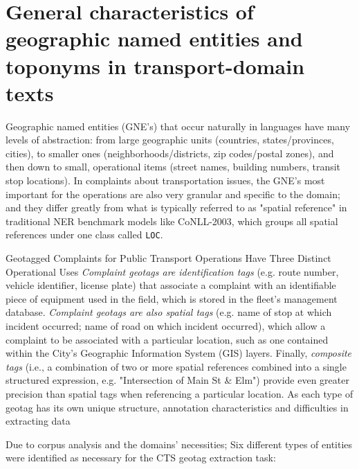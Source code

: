 \section{General characteristics of geographic named entities and toponyms in transport-domain texts}
\label{sec:geo_entities}

Geographic named entities (GNE's) that occur naturally in languages have many levels of abstraction: 
from large geographic units (countries, states/provinces, cities), 
to smaller ones (neighborhoods/districts, zip codes/postal zones), 
and then down to small, operational items (street names, building numbers, transit stop locations). 
In complaints about transportation issues, the GNE's most important for the operations are also very granular and specific to the domain; and they differ greatly from what is typically referred to as "spatial reference" in traditional NER benchmark models like CoNLL-2003, which groups all spatial references under one class called \texttt{LOC}.


Geotagged Complaints for Public Transport Operations Have Three Distinct Operational Uses 
\textit{ Complaint geotags are identification tags } (e.g. route number, vehicle identifier, license plate) that associate a complaint with an identifiable piece of equipment used in the field, which is stored in the fleet's management database. \textit{ Complaint geotags are also spatial tags } (e.g. name of stop at which incident occurred; name of road on which incident occurred), which allow a complaint to be associated with a particular location, such as one contained within the City's Geographic Information System (GIS) layers. Finally, \textit{composite tags} (i.e., a combination of two or more spatial references combined into a single structured expression, e.g. "Intersection of Main St \& Elm") provide even greater precision than spatial tags when referencing a particular location. As each type of geotag has its own unique structure, annotation characteristics and difficulties in extracting data


Due to corpus analysis and the domains' necessities; Six different types of entities were identified as necessary for the CTS geotag extraction task:

